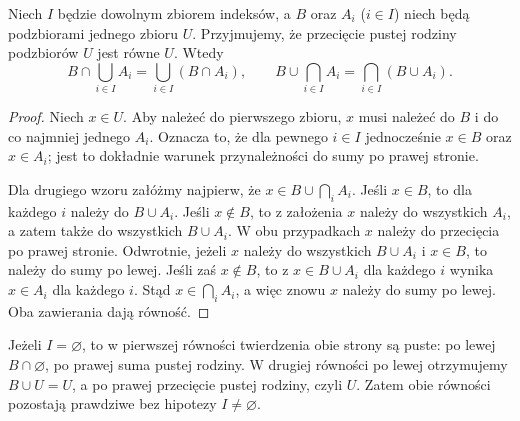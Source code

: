 \begin{twierdzenie}
\label{thm:arbitrary-distributivity}
Niech $I$ będzie dowolnym zbiorem indeksów, a $B$ oraz
$A_i$ ($i\in I$) niech będą podzbiorami jednego zbioru $U$.
Przyjmujemy, że przecięcie pustej rodziny podzbiorów $U$ jest równe $U$. Wtedy
\[
B\cap\bigcup_{i\in I}A_i
=\bigcup_{i\in I}(B\cap A_i),\qquad
B\cup\bigcap_{i\in I}A_i
=\bigcap_{i\in I}(B\cup A_i).
\]
\end{twierdzenie}
\begin{proof}
Niech $x\in U$. Aby należeć do pierwszego zbioru, $x$
musi należeć do $B$ i do co najmniej jednego $A_i$.
Oznacza to, że dla pewnego $i\in I$ jednocześnie
$x\in B$ oraz $x\in A_i$; jest to dokładnie warunek
przynależności do sumy po prawej stronie.

Dla drugiego wzoru załóżmy najpierw, że
$x\in B\cup\bigcap_i A_i$. Jeśli $x\in B$, to dla każdego
$i$ należy do $B\cup A_i$. Jeśli $x\notin B$, to z założenia
$x$ należy do wszystkich $A_i$, a zatem także do wszystkich
$B\cup A_i$. W obu przypadkach $x$ należy do przecięcia
po prawej stronie.
Odwrotnie, jeżeli $x$ należy do wszystkich $B\cup A_i$
i $x\in B$, to należy do sumy po lewej. Jeśli zaś $x\notin B$,
to z $x\in B\cup A_i$ dla każdego $i$ wynika $x\in A_i$
dla każdego $i$. Stąd $x\in\bigcap_i A_i$, a więc znowu
$x$ należy do sumy po lewej. Oba zawierania dają równość.
\end{proof}

\begin{przyklad}
Jeżeli $I=\varnothing$, to w pierwszej równości twierdzenia obie
strony są puste: po lewej $B\cap\varnothing$, po prawej suma
pustej rodziny. W drugiej równości po lewej otrzymujemy
$B\cup U=U$, a po prawej przecięcie pustej rodziny, czyli $U$.
Zatem obie równości pozostają prawdziwe bez hipotezy $I\ne\varnothing$.
\end{przyklad}

